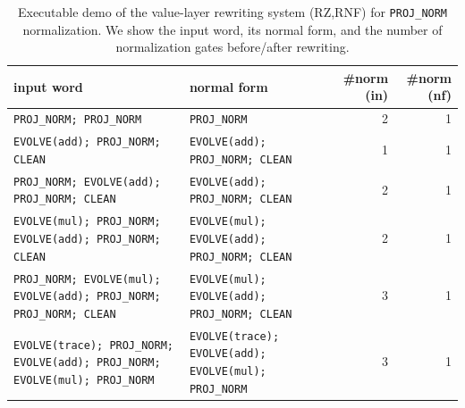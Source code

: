 \begin{table}[H]
\centering
\scriptsize
\setlength{\tabcolsep}{6pt}
\caption{Executable demo of the value-layer rewriting system (RZ,RNF) for \texttt{PROJ\_NORM} normalization. We show the input word, its normal form, and the number of normalization gates before/after rewriting.}
\label{tab:pom_rewriting_engine_demo}
\begin{tabular}{l l r r}
\toprule
input word & normal form & \#norm (in) & \#norm (nf)\\
\midrule
\texttt{PROJ\_NORM; PROJ\_NORM} & \texttt{PROJ\_NORM} & 2 & 1\\
\texttt{EVOLVE(add); PROJ\_NORM; CLEAN} & \texttt{EVOLVE(add); PROJ\_NORM; CLEAN} & 1 & 1\\
\texttt{PROJ\_NORM; EVOLVE(add); PROJ\_NORM; CLEAN} & \texttt{EVOLVE(add); PROJ\_NORM; CLEAN} & 2 & 1\\
\texttt{EVOLVE(mul); PROJ\_NORM; EVOLVE(add); PROJ\_NORM; CLEAN} & \texttt{EVOLVE(mul); EVOLVE(add); PROJ\_NORM; CLEAN} & 2 & 1\\
\texttt{PROJ\_NORM; EVOLVE(mul); EVOLVE(add); PROJ\_NORM; PROJ\_NORM; CLEAN} & \texttt{EVOLVE(mul); EVOLVE(add); PROJ\_NORM; CLEAN} & 3 & 1\\
\texttt{EVOLVE(trace); PROJ\_NORM; EVOLVE(add); PROJ\_NORM; EVOLVE(mul); PROJ\_NORM} & \texttt{EVOLVE(trace); EVOLVE(add); EVOLVE(mul); PROJ\_NORM} & 3 & 1\\
\bottomrule
\end{tabular}
\end{table}
